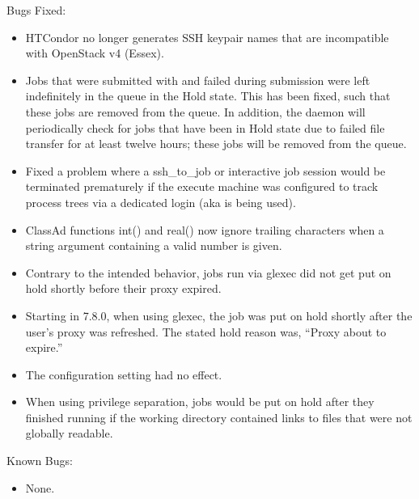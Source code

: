 \noindent Bugs Fixed:

\begin{itemize}

\item HTCondor no longer generates SSH keypair names that are incompatible
with OpenStack v4 (Essex).

\item Jobs that were submitted with  
and failed during submission were 
left indefinitely in the queue in the Hold state.  
This has been fixed, such that these jobs are removed from the queue.
In addition, the  daemon will periodically 
check for jobs that have
been in Hold state due to failed file transfer for at least twelve hours;
these jobs will be removed from the queue.

\item Fixed a problem where a ssh\_to\_job or interactive job session would be terminated prematurely if the execute machine was configured to track process trees via a dedicated login (aka  is being used).  

\item ClassAd functions int() and real() now ignore trailing characters
when a string argument containing a valid number is given.

\item Contrary to the intended behavior, jobs run via glexec did not
get put on hold shortly before their proxy expired.

\item Starting in 7.8.0, when using glexec, the job was put on hold
shortly after the user's proxy was refreshed.  The stated hold
reason was, ``Proxy about to expire.''

\item The configuration setting
 had no effect.

\item When using privilege separation, jobs would be put on hold after
they finished running if the working directory contained links to
files that were not globally readable.

\end{itemize}

\noindent Known Bugs:

\begin{itemize}

\item None.

\end{itemize}

